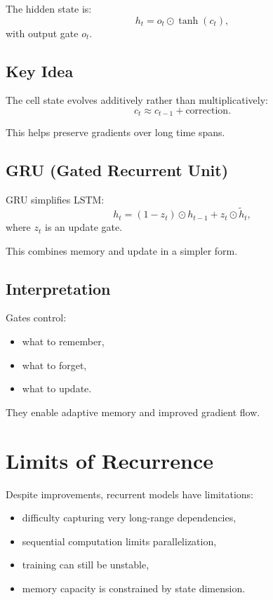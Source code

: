 The hidden state is:
\[
h_t = o_t \odot \tanh(c_t),
\]
with output gate $o_t$.

\subsection{Key Idea}

The cell state evolves additively rather than multiplicatively:
\[
c_t \approx c_{t-1} + \text{correction}.
\]

This helps preserve gradients over long time spans.

\subsection{GRU (Gated Recurrent Unit)}

GRU simplifies LSTM:
\[
h_t = (1 - z_t) \odot h_{t-1} + z_t \odot \tilde{h}_t,
\]
where $z_t$ is an update gate.

This combines memory and update in a simpler form.

\subsection{Interpretation}

Gates control:
\begin{itemize}
    \item what to remember,
    \item what to forget,
    \item what to update.
\end{itemize}

They enable adaptive memory and improved gradient flow.

\section{Limits of Recurrence}

Despite improvements, recurrent models have limitations:

\begin{itemize}
    \item difficulty capturing very long-range dependencies,
    \item sequential computation limits parallelization,
    \item training can still be unstable,
    \item memory capacity is constrained by state dimension.
\end{itemize}

